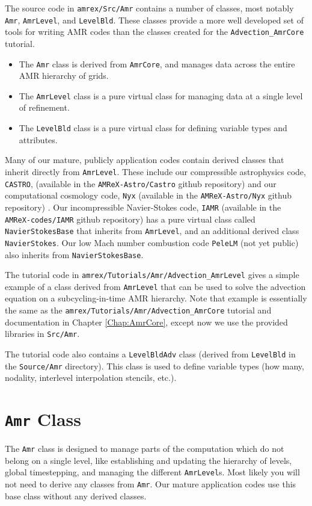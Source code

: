 The source code in {\tt amrex/Src/Amr} contains a number of classes, most notably
{\tt Amr}, {\tt AmrLevel}, and {\tt LevelBld}.
These classes provide a more well developed set of tools for writing AMR codes
than the classes created for the {\tt Advection\_AmrCore} tutorial.
\begin{itemize}
\item The {\tt Amr} class is derived from {\tt AmrCore}, and manages data across the 
entire AMR hierarchy of grids.
\item The {\tt AmrLevel} class is a pure virtual class for managing data at a
single level of refinement.
\item The {\tt LevelBld} class is a pure virtual class for defining variable types
and attributes.
\end{itemize}

Many of our mature, publicly application codes contain derived classes that inherit directly
from {\tt AmrLevel}.  These include our compressible astrophysics code,
{\tt CASTRO},
(available in the {\tt AMReX-Astro/Castro} github repository) 
 and our computational cosmology code, {\tt Nyx}
(available in the {\tt AMReX-Astro/Nyx} github repository)   .
Our incompressible Navier-Stokes code, {\tt IAMR}
(available in the {\tt AMReX-codes/IAMR} github repository)
has a pure virtual class called {\tt NavierStokesBase} that inherits from {\tt AmrLevel},
and an additional derived class {\tt NavierStokes}.
Our low Mach number combustion code {\tt PeleLM} (not yet public) also inherits
from {\tt NavierStokesBase}.

The tutorial code in {\tt amrex/Tutorials/Amr/Advection\_AmrLevel} gives a simple
example of a class derived from {\tt AmrLevel} that can be used to solve
the advection equation on a subcycling-in-time AMR hierarchy.  Note that example
is essentially the same as the {\tt amrex/Tutorials/Amr/Advection\_AmrCore} tutorial
and documentation in Chapter \ref{Chap:AmrCore}, except now we use the provided
libraries in {\tt Src/Amr}.

The tutorial code also contains a {\tt LevelBldAdv} class (derived from {\tt LevelBld} in the
{\tt Source/Amr} directory).  This class is used to define variable types (how many, nodality,
interlevel interpolation stencils, etc.).

\section{{\tt Amr} Class}
The {\tt Amr} class is designed to manage parts of the computation  which do
not belong on a single level, like establishing and updating the hierarchy
of levels, global timestepping, and managing the different {\tt AmrLevel}s.
Most likely you will not need to derive any classes from {\tt Amr}.  Our mature
application codes use this base class without any derived classes.

